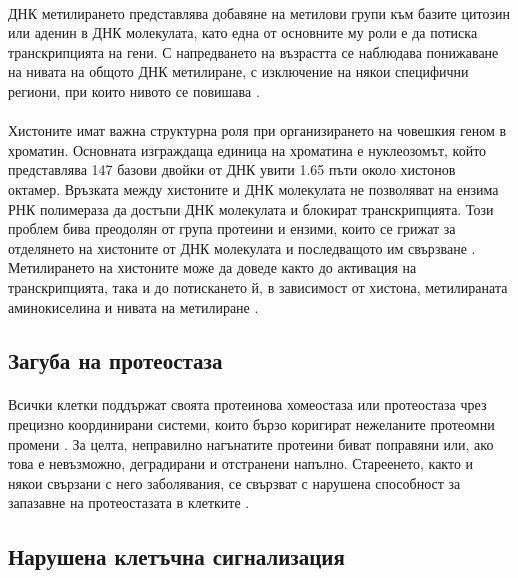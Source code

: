 \documentclass[pdftex,cyrillic,14pt,a4page,twoside,openright]{extreport}
\begin{document}
\paragraph{}
ДНК метилирането представлява добавяне на метилови групи към базите цитозин или аденин в ДНК молекулата, като една от основните му роли е да потиска транскрипцията на гени. С напредването на възрастта се наблюдава понижаване на нивата на общото ДНК метилиране, с изключение на някои специфични региони, при които нивото се повишава \cite{jung2015}.

\paragraph{}
Хистоните имат важна структурна роля при организирането на човешкия геном в хроматин. Основната изграждаща единица на хроматина е нуклеозомът, който представлява 147 базови двойки от ДНК увити 1.65 пъти около хистонов октамер. Връзката между хистоните и ДНК молекулата не позволяват на ензима РНК полимераза да достъпи ДНК молекулата и блокират транскрипцията. Този проблем бива преодолян от група протеини и ензими, които се грижат за отделянето на хистоните от ДНК молекулата и последващото им свързване \cite{das2012}. Метилирането на хистоните може да доведе както до активация на транскрипцията, така и до потискането й, в зависимост от хистона, метилираната аминокиселина и нивата на метилиране \cite{yi2020}.

\subsection{Загуба на протеостаза}
\paragraph{}
Всички клетки поддържат своята протеинова хомеостаза или протеостаза чрез прецизно координирани системи, които бързо коригират нежеланите протеомни промени \cite{kaushik2015}. За целта, неправилно нагънатите протеини биват поправяни или, ако това е невъзможно, деградирани и отстранени напълно. Стареенето, както и някои свързани с него заболявания, се свързват с нарушена способност за запазавне на протеостазата в клетките \cite{lopezotin2013}.

\subsection{Нарушена клетъчна сигнализация}
\end{document}
